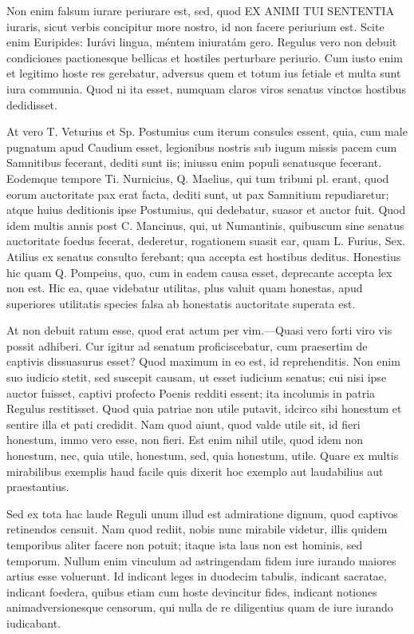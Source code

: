  Non enim falsum iurare periurare est, sed, quod EX ANIMI TUI SENTENTIA iuraris, sicut verbis concipitur more nostro, id non facere periurium est. Scite enim Euripides: Iurávi lingua, méntem iniuratám gero. Regulus vero non debuit condiciones pactionesque bellicas et hostiles perturbare periurio. Cum iusto enim et legitimo hoste res gerebatur, adversus quem et totum ius fetiale et multa sunt iura communia. Quod ni ita esset, numquam claros viros senatus vinctos hostibus dedidisset.

 At vero T. Veturius et Sp. Postumius cum iterum consules essent, quia, cum male pugnatum apud Caudium esset, legionibus nostris sub iugum missis pacem cum Samnitibus fecerant, dediti sunt iis; iniussu enim populi senatusque fecerant. Eodemque tempore Ti. Nurnicius, Q. Maelius, qui tum tribuni pl. erant, quod eorum auctoritate pax erat facta, dediti sunt, ut pax Samnitium repudiaretur; atque huius deditionis ipse Postumius, qui dedebatur, suasor et auctor fuit. Quod idem multis annis post C. Mancinus, qui, ut Numantinis, quibuscum sine senatus auctoritate foedus fecerat, dederetur, rogationem suasit ear, quam L. Furius, Sex. Atilius ex senatus consulto ferebant; qua accepta est hostibus deditus. Honestius hic quam Q. Pompeius, quo, cum in eadem causa esset, deprecante accepta lex non est. Hic ea, quae videbatur utilitas, plus valuit quam honestas, apud superiores utilitatis species falsa ab honestatis auctoritate superata est.

 At non debuit ratum esse, quod erat actum per vim.—Quasi vero forti viro vis possit adhiberi. Cur igitur ad senatum proficiscebatur, cum praesertim de captivis dissuasurus esset? Quod maximum in eo est, id reprehenditis. Non enim suo iudicio stetit, sed suscepit causam, ut esset iudicium senatus; cui nisi ipse auctor fuisset, captivi profecto Poenis redditi essent; ita incolumis in patria Regulus restitisset. Quod quia patriae non utile putavit, idcirco sibi honestum et sentire illa et pati credidit. Nam quod aiunt, quod valde utile sit, id fieri honestum, immo vero esse, non fieri. Est enim nihil utile, quod idem non honestum, nec, quia utile, honestum, sed, quia honestum, utile. Quare ex multis mirabilibus exemplis haud facile quis dixerit hoc exemplo aut laudabilius aut praestantius.

 Sed ex tota hac laude Reguli unum illud est admiratione dignum, quod captivos retinendos censuit. Nam quod rediit, nobis nunc mirabile videtur, illis quidem temporibus aliter facere non potuit; itaque ista laus non est hominis, sed temporum. Nullum enim vinculum ad astringendam fidem iure iurando maiores artius esse voluerunt. Id indicant leges in duodecim tabulis, indicant sacratae, indicant foedera, quibus etiam cum hoste devincitur fides, indicant notiones animadversionesque censorum, qui nulla de re diligentius quam de iure iurando iudicabant.

